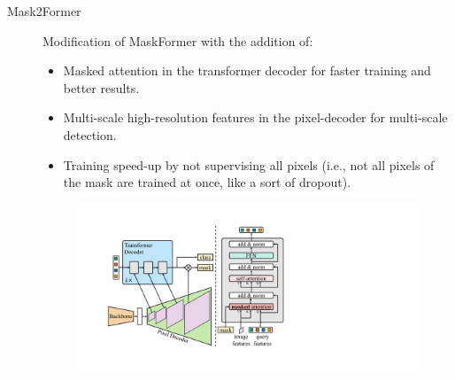 \begin{description}
    \item[Mask2Former] 
        Modification of MaskFormer with the addition of:
        \begin{itemize}
            \item Masked attention in the transformer decoder for faster training and better results.
            \item Multi-scale high-resolution features in the pixel-decoder for multi-scale detection.
            \item Training speed-up by not supervising all pixels (i.e., not all pixels of the mask are trained at once, like a sort of dropout).
        \end{itemize}

        \begin{figure}[H]
            \centering
            \includegraphics[width=0.45\linewidth]{./img/_mask2former.pdf}
        \end{figure}
\end{description}



